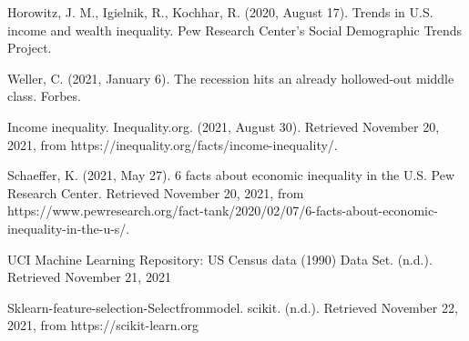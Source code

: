 \documentclass[12pt]{article}
\begin{document}
\begin{thebibliography}{9}
	Horowitz, J. M., Igielnik, R.,  Kochhar, R. (2020, August 17). Trends in U.S. income and wealth inequality. Pew Research Center's Social Demographic Trends Project.

	Weller, C. (2021, January 6). The recession hits an already hollowed-out middle class. Forbes.

	Income inequality. Inequality.org. (2021, August 30). Retrieved November 20, 2021, from https://inequality.org/facts/income-inequality/. 

	Schaeffer, K. (2021, May 27). 6 facts about economic inequality in the U.S. Pew Research Center. Retrieved November 20, 2021, from https://www.pewresearch.org/fact-tank/2020/02/07/6-facts-about-economic-inequality-in-the-u-s/.
	
	UCI Machine Learning Repository: US Census data (1990) Data Set. (n.d.). Retrieved November 21, 2021

	Sklearn-feature-selection-Selectfrommodel. scikit. (n.d.). Retrieved November 22, 2021, from  https://scikit-learn.org 

\end{thebibliography}
\end{document}
